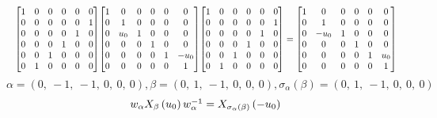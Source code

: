\documentclass[11pt]{article}
\theoremstyle{definition}
\begin{document}
\[
\scaletoalign{\textwidth}{{\left[\begin{matrix}1 & 0 & 0 & 0 & 0 & 0\\0 & 0 & 0 & 0 & 0 & 1\\0 & 0 & 0 & 0 & 1 & 0\\0 & 0 & 0 & 1 & 0 & 0\\0 & 0 & 1 & 0 & 0 & 0\\0 & 1 & 0 & 0 & 0 & 0\end{matrix}\right]} {\left[\begin{matrix}1 & 0 & 0 & 0 & 0 & 0\\0 & 1 & 0 & 0 & 0 & 0\\0 & u_{0} & 1 & 0 & 0 & 0\\0 & 0 & 0 & 1 & 0 & 0\\0 & 0 & 0 & 0 & 1 & - u_{0}\\0 & 0 & 0 & 0 & 0 & 1\end{matrix}\right]} {\left[\begin{matrix}1 & 0 & 0 & 0 & 0 & 0\\0 & 0 & 0 & 0 & 0 & 1\\0 & 0 & 0 & 0 & 1 & 0\\0 & 0 & 0 & 1 & 0 & 0\\0 & 0 & 1 & 0 & 0 & 0\\0 & 1 & 0 & 0 & 0 & 0\end{matrix}\right]} = {\left[\begin{matrix}1 & 0 & 0 & 0 & 0 & 0\\0 & 1 & 0 & 0 & 0 & 0\\0 & - u_{0} & 1 & 0 & 0 & 0\\0 & 0 & 0 & 1 & 0 & 0\\0 & 0 & 0 & 0 & 1 & u_{0}\\0 & 0 & 0 & 0 & 0 & 1\end{matrix}\right]}}
\]
\[
\alpha = \left( 0, \  -1, \  -1, \  0, \  0, \  0\right), \beta = \left( 0, \  1, \  -1, \  0, \  0, \  0\right), \sigma_{\alpha}(\beta) = \left( 0, \  1, \  -1, \  0, \  0, \  0\right)
\]
\[
\scaletoalign{\textwidth}{w_{\alpha} X_{\beta}\left(u_{0}\right) w_{\alpha}^{-1} = X_{\sigma_{\alpha}\left(\beta\right)}\left(- u_{0}\right)}
\]
\end{document}
